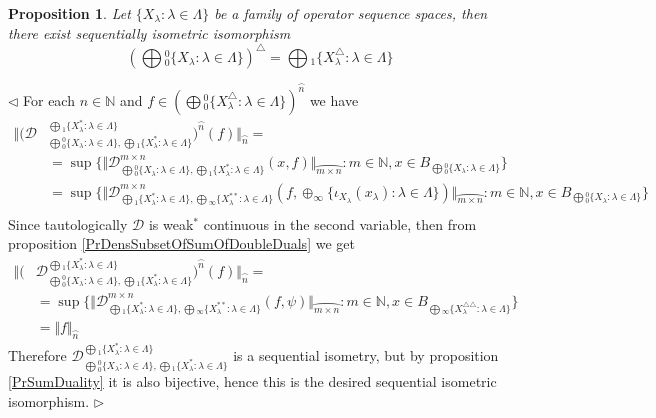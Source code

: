 \documentclass[12pt]{article}
\newtheorem{proposition}[theorem]{Proposition}
\newenvironment{proof}{\par $\triangleleft$}{$\triangleright$}
\begin{document}
\begin{proposition}\label{PrDualOfc0SumIsCoProd}
Let $\{X_\lambda:\lambda\in \Lambda\}$ be a family of operator sequence spaces, then there exist sequentially isometric isomorphism
$$
\left(\bigoplus{}_0^0\{X_\lambda:\lambda\in \Lambda\}\right)^\triangle
=\bigoplus{}_1\{X_\lambda^\triangle:\lambda\in \Lambda\}
$$
\end{proposition}
\begin{proof}
For each $n\in\mathbb{N}$ and $f\in \left(\bigoplus{}_0^0\{X_\lambda^\triangle:\lambda\in \Lambda\}\right)^{\wideparen{n}}$ we have 
$$
\begin{aligned}
\Vert(\mathcal{D}&_{\bigoplus{}_0^0\{X_\lambda:\lambda\in \Lambda\},\bigoplus{}_1\{X_\lambda^*:\lambda\in \Lambda\}}^{\bigoplus{}_1\{X_\lambda^*:\lambda\in \Lambda\}})^{\wideparen{n}}(f)\Vert_{\wideparen{n}}=\\
&=\sup\{\Vert\mathcal{D}_{\bigoplus{}_0^0\{X_\lambda:\lambda\in \Lambda\},\bigoplus{}_1\{X_\lambda^*:\lambda\in \Lambda\}}^{m\times n}(x,f)\Vert_{\wideparen{m\times n}}:m\in\mathbb{N}, x\in B_{\bigoplus{}_0^0\{X_\lambda:\lambda\in \Lambda\}}\}\\
&=\sup\{\Vert\mathcal{D}_{\bigoplus{}_1\{X_\lambda^*:\lambda\in \Lambda\},\bigoplus{}_\infty\{X_\lambda^{**}:\lambda\in \Lambda\}}^{m\times n}(f,\oplus_\infty\{\iota_{X_\lambda}(x_\lambda):\lambda\in\Lambda\})\Vert_{\wideparen{m\times n}}:m\in\mathbb{N}, x\in B_{\bigoplus{}_0^0\{X_\lambda:\lambda\in \Lambda\}}\}\\
\end{aligned}
$$
Since tautologically $\mathcal{D}$ is weak${}^*$ continuous in the second variable, then from proposition \ref{PrDensSubsetOfSumOfDoubleDuals} we get
$$
\begin{aligned}
\Vert(&\mathcal{D}_{\bigoplus{}_0^0\{X_\lambda:\lambda\in \Lambda\},\bigoplus{}_1\{X_\lambda^*:\lambda\in \Lambda\}}^{\bigoplus{}_1\{X_\lambda^*:\lambda\in \Lambda\}})^{\wideparen{n}}(f)\Vert_{\wideparen{n}}=\\
&=\sup\{\Vert\mathcal{D}_{\bigoplus{}_1\{X_\lambda^*:\lambda\in \Lambda\},\bigoplus{}_\infty\{X_\lambda^{**}:\lambda\in \Lambda\}}^{m\times n}(f,\psi)\Vert_{\wideparen{m\times n}}:m\in\mathbb{N}, x\in B_{\bigoplus{}_\infty\{X_\lambda^{\triangle\triangle}:\lambda\in \Lambda\}}\}\\
&=\Vert f\Vert_{\wideparen{n}}
\end{aligned}
$$
Therefore $\mathcal{D}_{\bigoplus{}_0^0\{X_\lambda:\lambda\in \Lambda\},\bigoplus{}_1\{X_\lambda^*:\lambda\in \Lambda\}}^{\bigoplus{}_1\{X_\lambda^*:\lambda\in \Lambda\}}$ is a sequential isometry, but by proposition \ref{PrSumDuality} it is also bijective, hence this is the desired sequential isometric isomorphism.
\end{proof}
\end{document}
